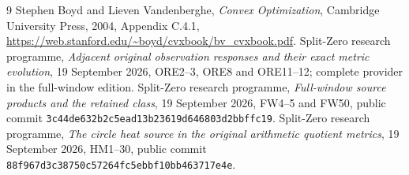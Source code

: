 \documentclass[11pt]{article}
\begin{document}
\begin{thebibliography}{9}
 Stephen Boyd and Lieven Vandenberghe,
\emph{Convex Optimization}, Cambridge University Press, 2004,
Appendix C.4.1,
\url{https://web.stanford.edu/~boyd/cvxbook/bv_cvxbook.pdf}.
 Split-Zero research programme,
\emph{Adjacent original observation responses and their exact metric
evolution}, 19 September 2026, ORE2--3, ORE8 and ORE11--12;
complete provider in the full-window edition.
 Split-Zero research programme,
\emph{Full-window source products and the retained class},
19 September 2026, FW4--5 and FW50, public commit
\texttt{3c44de632b2c5ead13b23619d646803d2bbffc19}.
 Split-Zero research programme,
\emph{The circle heat source in the original arithmetic quotient metrics},
19 September 2026, HM1--30, public commit
\texttt{88f967d3c38750c57264fc5ebbf10bb463717e4e}.
\end{thebibliography}

\endgroup
\end{document}
